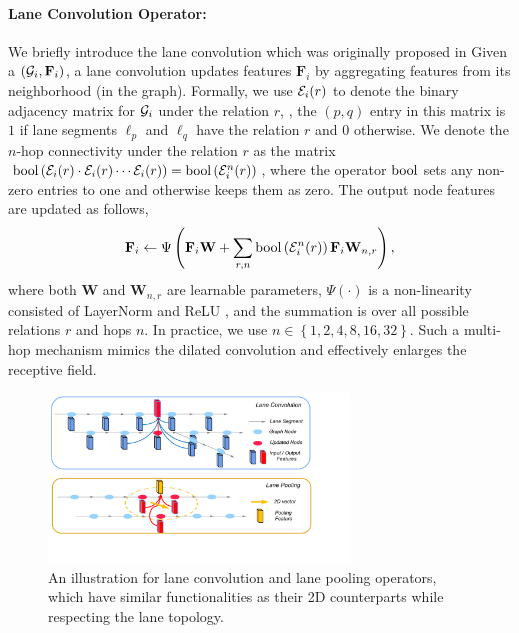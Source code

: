 \paragraph{Lane Convolution Operator:}
We briefly introduce the lane convolution which was originally proposed in \cite{lgn}
Given a \ROI $(\mathcal{G}_i, \mathbf{F}_i)$, 
a lane convolution updates features $\mathbf{F}_i$ by aggregating features from
its neighborhood (in the graph). 
Formally, we use $\mathcal{E}_i(r)$ to denote the 
binary adjacency matrix for $\mathcal{G}_i$ under the relation $r$, \ie, the $(p, q)$ entry 
in this matrix is $1$ if lane segments $\ell_p$ and $\ell_q$ have the relation $r$ 
and $0$ otherwise. 
We denote the $n$-hop connectivity under the relation $r$ as the matrix 
$\operatorname{bool}\left(\mathcal{E}_i(r) \cdot \mathcal{E}_i(r) \cdots \mathcal{E}_i(r)\right) = \operatorname{bool}
\left(\mathcal{E}_i^n(r)\right)$, where the operator $\operatorname{bool}$ sets any non-zero entries to one 
and otherwise keeps them as zero. 
The output node features are updated as follows,
\begin{equation}
  \label{eq:conv}
  \mathbf{F}_i \leftarrow \Psi \left( \mathbf{F}_i\mathbf{W} + \sum_{r, n}
  \operatorname{bool} \left(\mathcal{E}_i^n(r)\right)\mathbf{F}_i\mathbf{W}_{n, r} \right),
\end{equation}
where both $\mathbf{W}$ and $\mathbf{W}_{n, r}$ are learnable
parameters, $\Psi(\cdot)$ is a non-linearity consisted of
LayerNorm \cite{layernorm} and ReLU \cite{relu},
and the summation is over all possible relations $r$
and hops $n$. In practice, we use 
$n \in \left\{1, 2, 4,
8, 16, 32\right\}$.
Such a multi-hop mechanism mimics the dilated convolution \cite{yu2015multi} and effectively enlarges
the receptive field.

\begin{figure}[t]
\begin{center}
  \includegraphics[height=4.5cm]{figures/operator.pdf}
\end{center}
\vspace{-0.2cm}
\caption{An illustration for lane convolution and lane
pooling operators, which have similar functionalities as their 2D counterparts
while respecting the lane topology.}
\label{fig:operator}
\end{figure}


